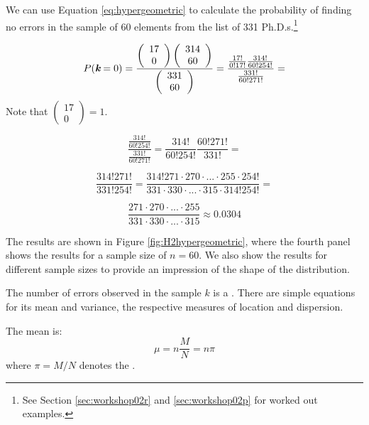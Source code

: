 We can use Equation \ref{eq:hypergeometric} to calculate the probability of finding no errors in the sample of 60 elements from the list of 331 Ph.D.s.\footnote{See Section \ref{sec:workshop02r} and \ref{sec:workshop02p} for worked out examples.}

\begin{equation*}
P(\textit{\textbf{k}} = 0) = \frac{
\left( \begin{array}{c}17\\0\end{array} \right)
\left( \begin{array}{c}314\\60\end{array} \right)}
{\left( \begin{array}{c}331\\60\end{array} \right)} = 
\frac{\frac{17!}{0!17!} \frac{314!}{60!254!}}{\frac{331!}{60!271!}} =
\end{equation*}
Note that $\left( \begin{array}{c}17\\0\end{array} \right) = 1$.

\begin{equation*}
\frac{\frac{314!}{60!254!}}{\frac{331!}{60!271!}} = \frac{314!}{60!254!} \frac{60!271!}{331!} =
\end{equation*}

\begin{equation*}
\frac{314! 271!}{331! 254!} = \frac{314! 271 \cdot 270 \cdot ... \cdot 255 \cdot 254!}{331 \cdot 330 \cdot ... \cdot 315 \cdot 314! 254!} =
\end{equation*}

\begin{equation*}
\frac{271 \cdot 270 \cdot ... \cdot 255 }{331 \cdot 330 \cdot ... \cdot 315} \approx 0.0304
\end{equation*}

The results are shown in Figure \ref{fig:H2hypergeometric}, where the fourth panel shows the results for a sample size of $n = 60$. We also show the results for different sample sizes to provide an impression of the shape of the distribution.

\bigskip
The number of errors observed in the sample $k$ is a . There are simple equations for its mean and variance, the respective measures of location and dispersion.

\bigskip
The mean is:
\begin{equation}
\mu = n \frac{M}{N} = n \pi
\end{equation}
where $\pi = M / N$ denotes the .

